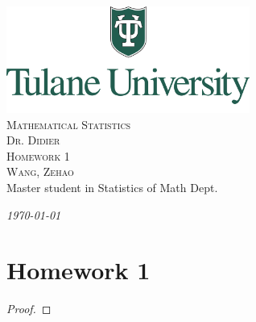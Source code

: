 \documentclass[12pt]{article}
\newcommand{\CN}{Mathematical Statistics}
\newcommand{\Ti}{Homework 1}
\newcommand{\Pf}{Dr. Didier}
\newcommand{\FN}{Zehao}
\newcommand{\LN}{Wang}
\begin{document}
\begin{titlepage}
    \begin{center}    
    \includegraphics[width=0.6\textwidth]{Tulane.png}\\[1cm]    
    
    \textsc{\Huge \CN}\\[0.5cm]
    \textsc{\large \Pf}\\[1.0cm]
    
    \textsc{\LARGE \Ti}\\[0.5cm]
    \textsc{\large \LN, \FN}\\
    {Master student in Statistics of Math Dept.}
    
    
    \vfill
    
    {\Large \emph{\today}}
    
    \end{center}
\end{titlepage}
    
    \setcounter{section}{1}    

    \section*{\Ti}

    \begin{exercise}
        
    \end{exercise}

    \begin{proof}
        
    \end{proof}
\end{document}
